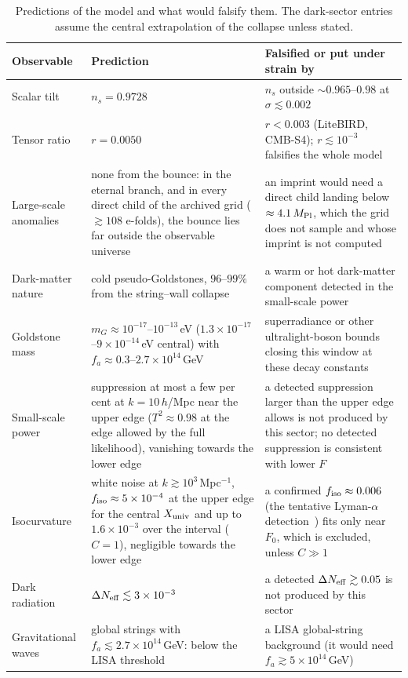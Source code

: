 \documentclass[11pt,a4paper]{article}
\newcommand{\Mpl}{M_{\rm Pl}}
\newcommand{\Xu}{X_{\rm univ}}
\begin{document}
\begin{table}[t]
\centering\small
\caption{Predictions of the model and what would falsify them. The dark-sector entries assume the central extrapolation of the collapse unless stated.}
\label{tab:predictions}
\begin{tabular}{L{3.0cm}L{5.4cm}L{5.6cm}}
\toprule
Observable & Prediction & Falsified or put under strain by\\
\midrule
Scalar tilt & $n_s = 0.9728$ & $n_s$ outside $\sim0.965$--$0.98$ at $\sigma\lesssim0.002$\\
Tensor ratio & $r = 0.0050$ & $r<0.003$ (LiteBIRD, CMB-S4); $r\lesssim10^{-3}$ falsifies the whole model\\
Large-scale anomalies & none from the bounce: in the eternal branch, and in every direct child of the archived grid ($\gtrsim108$ e-folds), the bounce lies far outside the observable universe & an imprint would need a direct child landing below $\approx4.1\,\Mpl$, which the grid does not sample and whose imprint is not computed\\
Dark-matter nature & cold pseudo-Goldstones, $96$--$99\%$ from the string--wall collapse & a warm or hot dark-matter component detected in the small-scale power\\
Goldstone mass & $m_G\approx10^{-17}$--$10^{-13}$\,eV ($1.3\times10^{-17}$--$9\times10^{-14}$\,eV central) with $f_a\approx0.3$--$2.7\times10^{14}$\,GeV & superradiance or other ultralight-boson bounds closing this window at these decay constants\\
Small-scale power & suppression at most a few per cent at $k=10\,h$/Mpc near the upper edge ($T^2\approx0.98$ at the edge allowed by the full likelihood), vanishing towards the lower edge & a detected suppression larger than the upper edge allows is not produced by this sector; no detected suppression is consistent with lower $F$\\
Isocurvature & white noise at $k\gtrsim10^3$\,Mpc$^{-1}$, $f_{\rm iso}\approx5\times10^{-4}$ at the upper edge for the central $\Xu$ and up to $1.6\times10^{-3}$ over the interval ($C=1$), negligible towards the lower edge & a confirmed $f_{\rm iso}\approx0.006$ (the tentative Lyman-$\alpha$ detection~\cite{GarciaGallego2026}) fits only near $F_0$, which is excluded, unless $C\gg1$\\
Dark radiation & $\Delta N_{\rm eff}\lesssim3\times10^{-3}$ & a detected $\Delta N_{\rm eff}\gtrsim0.05$ is not produced by this sector\\
Gravitational waves & global strings with $f_a\lesssim2.7\times10^{14}$\,GeV: below the LISA threshold~\cite{GHN2021} & a LISA global-string background (it would need $f_a\gtrsim5\times10^{14}$\,GeV)\\

\end{tabular}
\end{table}
\end{document}
